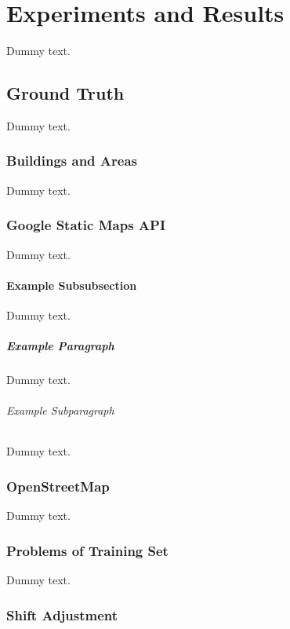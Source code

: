 \chapter{Experiments and Results}

Dummy text.

\section{Ground Truth}

Dummy text.

\subsection{Buildings and Areas}

Dummy text.

\subsection{Google Static Maps API}

Dummy text.

\subsubsection{Example Subsubsection}

Dummy text.

\paragraph{Example Paragraph}

Dummy text.

\subparagraph{Example Subparagraph}

Dummy text.

\subsection{OpenStreetMap}

Dummy text.

\subsection{Problems of Training Set}

Dummy text.

\subsection{Shift Adjustment}

